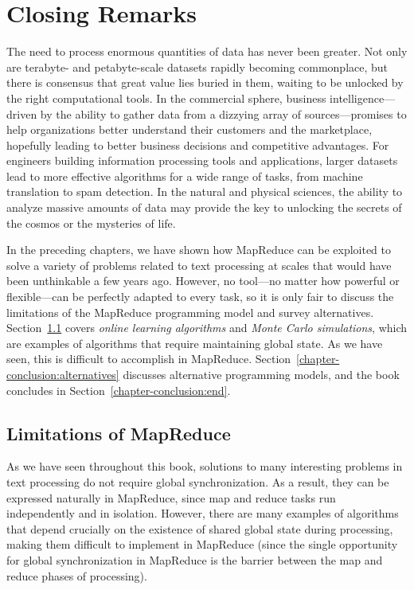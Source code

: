 \chapter{Closing Remarks}
\label{chapter8}

The need to process enormous quantities of data has never been
greater.  Not only are terabyte- and petabyte-scale datasets rapidly
becoming commonplace, but there is consensus that great value lies
buried in them, waiting to be unlocked by the right computational
tools.  In the commercial sphere, business intelligence---driven by
the ability to gather data from a dizzying array of sources---promises
to help organizations better understand their customers and the
marketplace, hopefully leading to better business decisions and
competitive advantages.  For engineers building information processing
tools and applications, larger datasets lead to more effective
algorithms for a wide range of tasks, from machine translation to spam
detection.  In the natural and physical sciences, the ability to
analyze massive amounts of data may provide the key to unlocking the
secrets of the cosmos or the mysteries of life.

In the preceding chapters, we have shown how MapReduce can be
exploited to solve a variety of problems related to text processing at
scales that would have been unthinkable a few years ago.  However, no
tool---no matter how powerful or flexible---can be perfectly adapted
to every task, so it is only fair to discuss the limitations of the
MapReduce programming model and survey alternatives.
Section~\ref{chapter-conclusion:limitations} covers \emph{online
  learning algorithms} and \emph{Monte Carlo simulations}, which are
examples of algorithms that require maintaining global state.  As we
have seen, this is difficult to accomplish in MapReduce.
Section~\ref{chapter-conclusion:alternatives} discusses alternative
programming models, and the book concludes in
Section~\ref{chapter-conclusion:end}.

\section{Limitations of MapReduce}
\label{chapter-conclusion:limitations}

As we have seen throughout this book, solutions to many interesting
problems in text processing do not require global synchronization.  As
a result, they can be expressed naturally in MapReduce, since map and
reduce tasks run independently and in isolation.  However, there are
many examples of algorithms that depend crucially on the existence of
shared global state during processing, making them difficult to
implement in MapReduce (since the single opportunity for global
synchronization in MapReduce is the barrier between the map and reduce
phases of processing).

